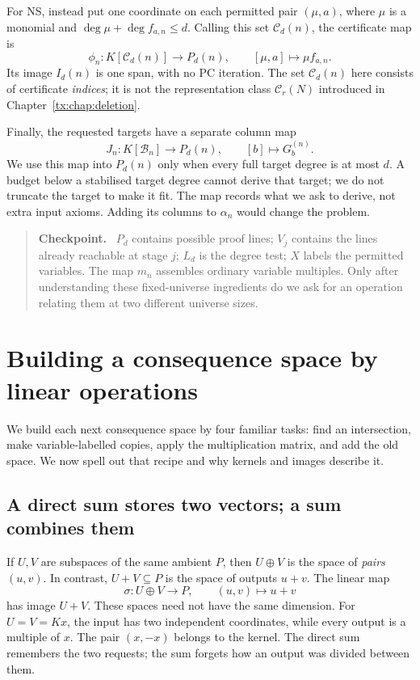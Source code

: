 \documentclass[11pt,a4paper,oneside,openany]{book}
\theoremstyle{definition}\newtheorem{definition}[theorem]{Definition}
\theoremstyle{remark}\newtheorem{remark}[theorem]{Remark}
\newenvironment{checkpoint}{\begin{quote}\small\textbf{Checkpoint.}\ }{\end{quote}}
\numberwithin{equation}{chapter}
\begin{document}
For NS, instead put one coordinate on each permitted pair $(\mu,a)$,
where $\mu$ is a monomial and
$\deg\mu+\deg f_{a,n}\le d$. Calling this set $\mathcal C_d(n)$,
the certificate map is
\[
 \phi_n:K[\mathcal C_d(n)]\to P_d(n),\qquad[\mu,a]\mapsto\mu f_{a,n}.
\]
Its image $I_d(n)$ is one span, with no PC iteration.
The set $\mathcal C_d(n)$ here consists of certificate \emph{indices};
it is not the representation class $\mathcal C_r(N)$ introduced
in Chapter~\ref{tx:chap:deletion}.

Finally, the requested targets have a separate column map
\[
       J_n:K[\mathcal B_n]\to P_d(n),\qquad[b]\mapsto G_b^{(n)}.
\]
We use this map into $P_d(n)$ only when every full target degree
is at most $d$. A budget below a stabilised target degree cannot
derive that target; we do not truncate the target to make it fit.
The map records what we ask to derive, not extra input axioms.
Adding its columns to $\alpha_n$ would change the problem.

\begin{checkpoint}
$P_d$ contains possible proof lines; $V_j$ contains the lines already
reachable at stage $j$; $L_d$ is the degree test; $X$ labels the permitted
variables. The map $m_n$ assembles ordinary variable multiples.
Only after understanding these fixed-universe ingredients do we ask for
an operation relating them at two different universe sizes.
\end{checkpoint}

\section{Building a consequence space by linear operations}\label{tx:sec:grammar}
We build each next consequence space by four familiar tasks:
find an intersection, make variable-labelled copies, apply the
multiplication matrix, and add the old space. We now spell out that
recipe and why kernels and images describe it.

\subsection{A direct sum stores two vectors; a sum combines them}
If $U,V$ are subspaces of the same ambient $P$, then $U\oplus V$
is the space of \emph{pairs} $(u,v)$. In contrast, $U+V\subseteq P$
is the space of outputs $u+v$. The linear map
\[
              \sigma:U\oplus V\to P,\qquad (u,v)\mapsto u+v
\]
has image $U+V$.
These spaces need not have the same dimension.
For $U=V=Kx$, the input has two independent coordinates,
while every output is a multiple of $x$. The pair $(x,-x)$
belongs to the kernel. The direct sum remembers the two requests;
the sum forgets how an output was divided between them.
\end{document}
